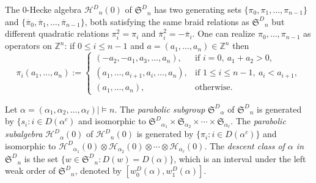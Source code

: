 \documentclass{amsart}
\newtheorem*{Young's Rule}{Young's Rule}
\theoremstyle{definition}
\theoremstyle{remark}
\numberwithin{equation}{section}
\begin{document}
The 0-Hecke algebra ${\mathcal{H}^D}_n(0)$ of ${{\mathfrak S}^D}_n$ has two generating sets $\{\pi_0,\pi_1,\ldots,\pi_{n-1}\}$ and $\{{\overline{\pi}}_0,{\overline{\pi}}_1,\ldots,{\overline{\pi}}_{n-1}\}$, both satisfying the same braid relations as ${{\mathfrak S}^D}_n$ but different quadratic relations $\pi_i^2=\pi_i$ and ${\overline{\pi}}_i^2=-{\overline{\pi}}_i$. One can realize $\pi_0,\ldots,\pi_{n-1}$ as operators on ${{\mathbb Z}}^n$: if $0\le i\le n-1$ and $a=(a_1,\ldots,a_n)\in{{\mathbb Z}}^n$ then 
\[ \pi_i(a_1,\ldots,a_n):=
\begin{cases}
(-a_2,-a_1,a_3,\ldots, a_n), & \text{if } i=0,\ a_1+a_2>0,\\
(a_1,\ldots,a_{i+1},a_i,\ldots,a_n), & \text{if } 1\leq i\leq n-1,\ a_i<a_{i+1},\\
(a_1,\ldots,a_n), & \text{otherwise}.
\end{cases} \] 

Let $\alpha=(\alpha_1,\alpha_2,\ldots,\alpha_\ell)\mid\models n$. The \emph{parabolic subgroup} ${{\mathfrak S}^D}_\alpha$ of ${{\mathfrak S}^D}_n$ is generated by $\{s_i:i\in D(\alpha^c)$ and isomorphic to ${{\mathfrak S}^D}_{\alpha_1}\times{{\mathfrak S}}_{\alpha_2}\times \cdots\times{{\mathfrak S}}_{\alpha_\ell}$.  The \emph{parabolic subalgebra} ${\mathcal{H}^D}_\alpha(0)$ of ${\mathcal{H}^D}_n(0)$ is generated by $\{\pi_i: i\in D(\alpha^c)\}$ and isomorphic to ${\mathcal{H}^D}_{\alpha_1}(0) \otimes{\mathcal{H}}_{\alpha_2}(0)\otimes\cdots\otimes {\mathcal{H}}_{\alpha_\ell}(0)$. The \emph{descent class of $\alpha$ in ${{\mathfrak S}^D}_n$} is the set $\{w\in{{\mathfrak S}^D}_n: D(w) = D(\alpha) \}$, which is an interval under the left weak order of ${{\mathfrak S}^D}_n$, denoted by $[w_0^D(\alpha),w_1^D(\alpha)]$. 
\end{document}
